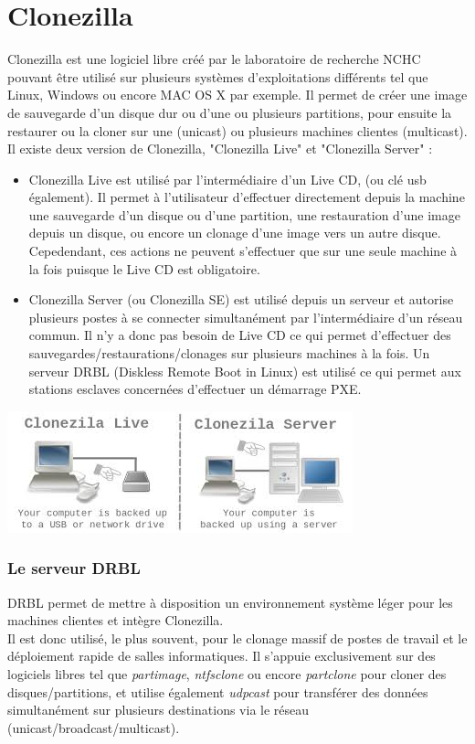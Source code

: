 \documentclass[a4paper,12pt,one side,titlepage]{report}
\begin{document}
\section{Clonezilla}
Clonezilla est une logiciel libre créé par le laboratoire de recherche NCHC pouvant être utilisé sur plusieurs systèmes d'exploitations différents tel que Linux, Windows ou encore MAC OS X par exemple. Il permet de créer une image de sauvegarde d'un disque dur ou d'une ou plusieurs partitions, pour ensuite la restaurer ou la cloner sur une (unicast) ou plusieurs machines clientes (multicast).\\
Il existe deux version de Clonezilla, "Clonezilla Live" et "Clonezilla Server" :\\
\begin{itemize}
  \item Clonezilla Live est utilisé par l'intermédiaire d'un Live CD, (ou clé usb également). Il permet à l'utilisateur d'effectuer directement depuis la machine une sauvegarde d'un disque ou d'une partition, une restauration d'une image depuis un disque, ou encore un clonage d'une image vers un autre disque. Cepedendant, ces actions ne peuvent s'effectuer que sur une seule machine à la fois puisque le Live CD est obligatoire.\\
  \item Clonezilla Server (ou Clonezilla SE) est utilisé depuis un serveur et autorise plusieurs postes à se connecter simultanément par l'intermédiaire d'un réseau commun. Il n'y a donc pas besoin de Live CD ce qui permet d'effectuer des sauvegardes/restaurations/clonages sur plusieurs machines à la fois. Un serveur DRBL (Diskless Remote Boot in Linux) est utilisé ce qui permet aux stations esclaves concernées d'effectuer un démarrage PXE.
\end{itemize}
\begin{center}\includegraphics[scale=0.9]{./img/clonezilla.jpeg}\end{center}
\vspace{1em}
\subsubsection{Le serveur DRBL}
DRBL permet de mettre à disposition un environnement système léger pour les machines clientes et intègre Clonezilla.\\
Il est donc utilisé, le plus souvent, pour le clonage massif de postes de travail et le déploiement rapide de salles informatiques. Il s'appuie exclusivement sur des logiciels libres tel que \textit{partimage}, \textit{ntfsclone} ou encore \textit{partclone} pour cloner des disques/partitions, et utilise également \textit{udpcast} pour transférer des données simultanément sur plusieurs destinations via le réseau (unicast/broadcast/multicast).
\end{document}
